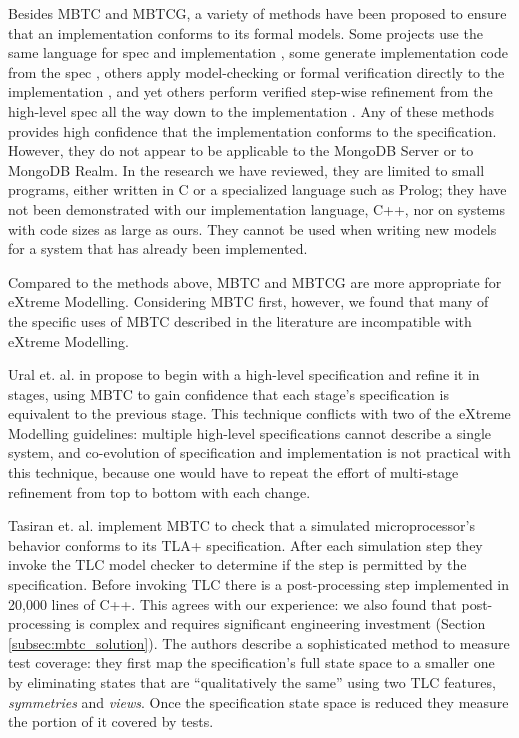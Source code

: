 \documentclass{vldb}
\begin{document}
Besides MBTC and MBTCG, a variety of methods have been proposed to ensure that an implementation conforms to its formal models.
Some projects use the same language for spec and implementation \cite{KerGre99}, some generate implementation code from the spec \cite{Houhou17CodeGenerationFromSpecification}, others apply model-checking or formal verification directly to the implementation \cite{Holzmann04ModelDrivenVerification, Chudnov18ContinuousFormalVerification}, and yet others perform verified step-wise refinement from the high-level spec all the way down to the implementation \cite{Eiriksson95UsingFormalVerification}.
Any of these methods provides high confidence that the implementation conforms to the specification. 
However, they do not appear to be applicable to the MongoDB Server or to MongoDB Realm.
In the research we have reviewed, they are limited to small programs, either written in C or a specialized language such as Prolog; they have not been demonstrated with our implementation language, C++, nor on systems with code sizes as large as ours.
They cannot be used when writing new models for a system that has already been implemented.

Compared to the methods above, MBTC and MBTCG are more appropriate for eXtreme Modelling.
Considering MBTC first, however, we found that many of the specific uses of MBTC described in the literature are incompatible with eXtreme Modelling.


Ural et. al. in \cite{Ural84AutomatedTestingOfProtocolSpecifications} propose to begin with a high-level specification and refine it in stages, using MBTC to gain confidence that each stage's specification is equivalent to the previous stage.
This technique conflicts with two of the eXtreme Modelling guidelines: multiple high-level specifications cannot describe a single system, and co-evolution of specification and implementation is not practical with this technique, because one would have to repeat the effort of multi-stage refinement from top to bottom with each change.

Tasiran et. al. \cite{Tasiran03AlphaMicroprocessor} implement MBTC to check that a simulated microprocessor's behavior conforms to its TLA+ specification.
After each simulation step they invoke the TLC model checker to determine if the step is permitted by the specification.
Before invoking TLC there is a post-processing step implemented in 20,000 lines of C++.
This agrees with our experience: we also found that post-processing is complex and requires significant engineering investment (Section \ref{subsec:mbtc_solution}).
The authors describe a sophisticated method to measure test coverage: they first map the specification's full state space to a smaller one by eliminating states that are ``qualitatively the same'' using two TLC features, \textit{symmetries} and \textit{views}. Once the specification state space is reduced they measure the portion of it covered by tests.
\end{document}
